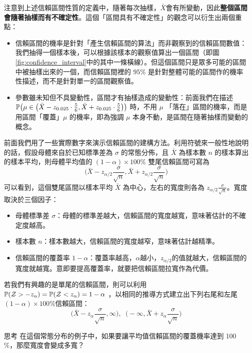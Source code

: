     注意到上述信賴區間性質的定義中，隨著每次抽樣，$\bar{X}$會有所變動，因此\textbf{整個區間會隨著抽樣而有不確定性}。這個「區間具有不確定性」的觀念可以衍生出兩個重點：
    \begin{itemize}
        \item 信賴區間的機率是針對「產生信賴區間的算法」而非觀察到的信賴區間數值：我們抽得一個樣本後，可以根據該樣本的觀察值算出一個區間（即圖 \ref{fig:confidence_interval}中的其中一條橫線）。但這個區間只是眾多可能的區間中被抽樣出來的一個，而信賴區間裡的 $95\%$ 是針對整體可能的區間作的機率性描述，而不是針對單一的區間觀察值。
        \item 參數雖未知但不具變動性，區間才有抽樣造成的變動性：前面我們在描述 $\mathbb{P}\big(\mu \in \big(\bar{X}-z_{0.025}\cdot \frac{5}{6},  \bar{X} + z_{0.025}\cdot \frac{5}{6}\big)\big)$ 時，不用 $\mu$ 「落在」區間的機率，而是用區間「覆蓋」$\mu$ 的機率，即為強調 $\mu$ 本身不動，是區間在隨著抽樣而變動的概念。
    \end{itemize}
    前面我們用了一些實際數字來演示信賴區間的建構方法。利用符號來一般性地說明的話，假設母體來自於已知標準差為 $\sigma$ 的常態分佈，且 $\bar{X}$ 為樣本數 $n$ 的樣本算出的樣本平均，則母體平均值的 $(1-\alpha) \times 100\%$ 雙尾信賴區間可寫為
    \[\Big(\bar{X}-z_{\alpha/2}\frac{\sigma}{\sqrt{n}},  \bar{X} + z_{\alpha/2}\frac{\sigma}{\sqrt{n}}\Big)\]
    可以看到，這個雙尾區間以樣本平均 $\bar{X}$ 為中心，左右的寬度則各為 $z_{\alpha/2}\frac{\sigma}{\sqrt{n}}$。寬度取決於三個因子：
    \begin{itemize}
        \item 母體標準差 $\sigma$：母體的標準差越大，信賴區間的寬度越寬，意味著估計的不確定度越高。
        \item 樣本數 $n$：樣本數越大，信賴區間的寬度越窄，意味著估計越精準。
        \item 信賴區間的覆蓋率 $1-\alpha$：覆蓋率越高，$\alpha$越小，$z_{\alpha/2}$的值就越大，信賴區間的寬度就越寬。意即要提高覆蓋率，就要把信賴區間拉寬作為代價。
    \end{itemize}
    若我們有興趣的是單尾的信賴區間，則可以利用 $\mathbb{P}(\mathcal{Z} > -z_{\alpha}) = \mathbb{P}(\mathcal{Z} < z_{\alpha}) = 1-\alpha$ ，以相同的推導方式建立出下列右尾和左尾$(1-\alpha) \times 100\%$信賴區間：
    \[\Big(\bar{X}-z_{\alpha}\frac{\sigma}{\sqrt{n}},  \infty\Big), \;\;\Big(-\infty,  \bar{X} + z_{\alpha}\frac{\sigma}{\sqrt{n}}\Big)\]
    
    \begin{custom}{思考}
       在這個常態分布的例子中，如果要讓平均值信賴區間的覆蓋機率達到 100 \%，那麼寬度會變成多寬？
    \end{custom}

